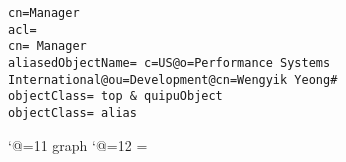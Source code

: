
\scriptsize
\begin{verbatim}
cn=Manager
acl= 
cn= Manager
aliasedObjectName= c=US@o=Performance Systems International@ou=Development@cn=Wengyik Yeong#
objectClass= top & quipuObject
objectClass= alias

\end{verbatim}

\catcode`@=11
\expandafter\ifx\csname graph\endcsname\relax {}\box\chardef\insc@unt\graph\fi
\catcode`@=12
\setbox\graph=\empty
